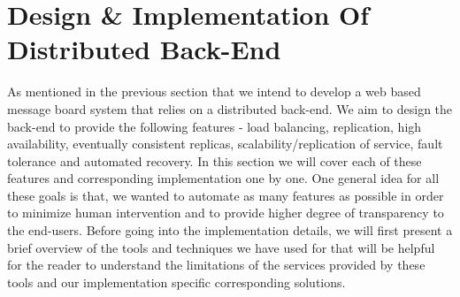 \documentclass[12pt, twocolumn]{article}
\begin{document}
\section {Design \& Implementation Of Distributed Back-End}
As mentioned in the previous section that we intend to develop a web based message board system that relies on a distributed back-end. We aim to design the back-end to provide the following features - load balancing, replication, high availability, eventually consistent replicas, scalability/replication of service, fault tolerance and automated recovery. In this section we will cover each of these features and corresponding implementation one by one. One general idea for all these goals is that, we wanted to automate as many features as possible in order to minimize human intervention and to provide higher degree of transparency to the end-users. Before going into the implementation details, we will first present a brief overview of the tools and techniques we have used for that will be helpful for the reader to understand the limitations of the services provided by these tools and our implementation specific corresponding solutions.
\end{document}
